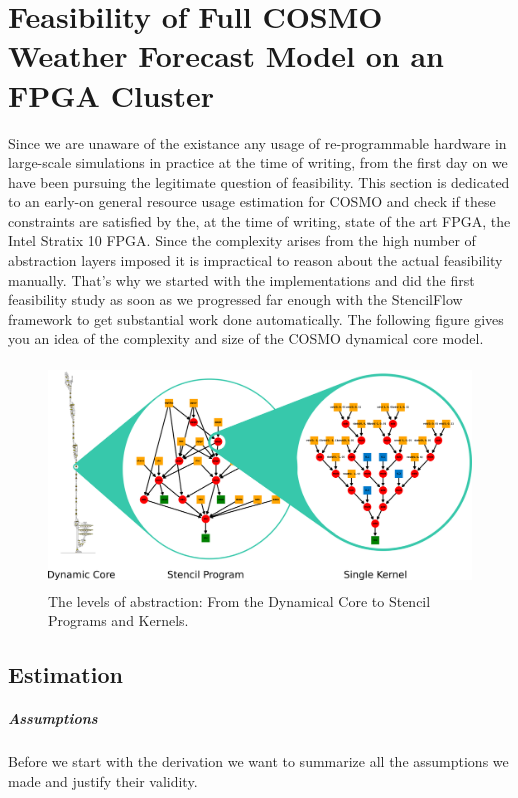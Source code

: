 \chapter{Feasibility of Full COSMO Weather Forecast Model on an FPGA Cluster}
Since we are unaware of the existance any usage of re-programmable hardware in large-scale simulations in practice at the time of writing, from the first day on we have been pursuing the legitimate question of feasibility. This section is dedicated to an early-on general resource usage estimation for COSMO and check if these constraints are satisfied by the, at the time of writing, state of the art FPGA, the Intel Stratix 10 FPGA. Since the complexity arises from the high number of abstraction layers imposed it is impractical to reason about the actual feasibility manually. That's why we started with the implementations and did the first feasibility study as soon as we progressed far enough with the StencilFlow framework to get substantial work done automatically. The following figure gives you an idea of the complexity and size of the COSMO dynamical core model.  
\begin{figure}[h]
	\centering
	\includegraphics[height=16em]{drawings/dycore-estimate-complexity.png}
	\caption{The levels of abstraction: From the Dynamical Core to Stencil Programs and Kernels.}
	\label{fig:dycore-estimate-complexity2}
\end{figure}

\section{Estimation}

\paragraph{Assumptions}
Before we start with the derivation we want to summarize all the assumptions we made and justify their validity.

